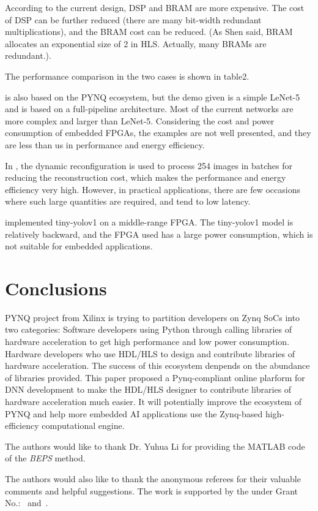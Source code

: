 According to the current design, DSP and BRAM are more expensive. The cost of DSP can be further reduced (there are many bit-width redundant multiplications), and the BRAM cost can be reduced. (As Shen \cite{shen2017maximizing} said, BRAM allocates an exponential size of 2 in HLS. Actually, many BRAMs are redundant.).

The performance comparison in the two cases is shown in table2.

\cite{wang2018pynq} is also based on the PYNQ ecosystem, but the demo given is a simple LeNet-5 and is based on a full-pipeline architecture. Most of the current networks are more complex and larger than LeNet-5. Considering the cost and power consumption of embedded FPGAs, the examples are not well presented, and they are less than us in performance and energy efficiency. 

In \cite{venieris2016fpgaconvnet}, the dynamic reconfiguration is used to process 254 images in batches for reducing the reconstruction cost, which makes the performance and energy efficiency very high. However, in practical applications, there are few occasions where such large quantities are required, and tend to low latency.

\cite{ma2017hardware} implemented tiny-yolov1 on a middle-range FPGA. The tiny-yolov1 model is relatively backward, and the FPGA used has a large power consumption, which is not suitable for embedded applications.

\section{Conclusions}
PYNQ project from Xilinx is trying to partition developers on Zynq SoCs into two categories: Software developers using Python through calling libraries of hardware acceleration to get high performance and low power consumption. Hardware developers who use HDL/HLS to design and contribute libraries of hardware acceleration. The success of this ecosystem denpends on the abundance of libraries provided. This paper proposed a Pynq-compliant online plarform for DNN development to make the HDL/HLS designer to contribute libraries of hardware acceleration much easier. It will potentially improve the ecosystem of PYNQ and help more embedded AI applications use the Zynq-based high-efficiency computational engine.

\begin{acks}
  The authors would like to thank Dr. Yuhua Li for providing the
  MATLAB code of the \textit{BEPS} method.

  The authors would also like to thank the anonymous referees for
  their valuable comments and helpful suggestions. The work is
  supported by the  under Grant
  No.:~
  and~.

\end{acks}
